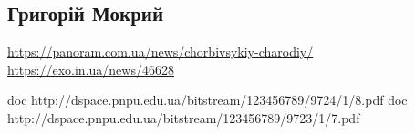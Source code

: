  
 
 

\subsection{Григорій Мокрий}
\label{sec:poetry.rus.grigoryi_mokryi}

\url{https://panoram.com.ua/news/chorbivsykiy-charodiy/}
\url{https://exo.in.ua/news/46628}

\ifcmt
	doc http://dspace.pnpu.edu.ua/bitstream/123456789/9724/1/8.pdf
	doc http://dspace.pnpu.edu.ua/bitstream/123456789/9723/1/7.pdf
\fi
